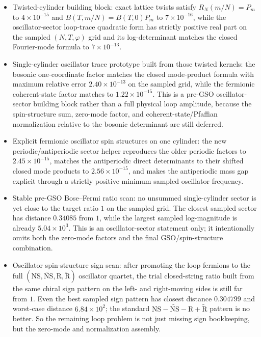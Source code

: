 \documentclass[11pt]{article}
\begin{document}
\begin{itemize}
\item Twisted-cylinder building block: exact lattice twists satisfy $R_N(m/N)=P_m$ to $4\times 10^{-15}$ and $B(T,m/N)=B(T,0)P_m$ to $7\times 10^{-16}$, while the oscillator-sector loop-trace quadratic form has strictly positive real part on the sampled $(N,T,\varphi)$ grid and its log-determinant matches the closed Fourier-mode formula to $7\times 10^{-13}$.
\item Single-cylinder oscillator trace prototype built from those twisted kernels: the bosonic one-coordinate factor matches the closed mode-product formula with maximum relative error $2.40\times 10^{-13}$ on the sampled grid, while the fermionic coherent-state factor matches to $1.22\times 10^{-15}$. This is a pre-GSO oscillator-sector building block rather than a full physical loop amplitude, because the spin-structure sum, zero-mode factor, and coherent-state/Pfaffian normalization relative to the bosonic determinant are still deferred.
\item Explicit fermionic oscillator spin structures on one cylinder: the new periodic/antiperiodic sector helper reproduces the older periodic factors to $2.45\times10^{-15}$, matches the antiperiodic direct determinants to their shifted closed mode products to $2.56\times10^{-15}$, and makes the antiperiodic mass gap explicit through a strictly positive minimum sampled oscillator frequency.
\item Stable pre-GSO Bose--Fermi ratio scan: no unsummed single-cylinder sector is yet close to the target ratio $1$ on the sampled grid. The closest sampled sector has distance $0.34085$ from $1$, while the largest sampled log-magnitude is already $5.04\times 10^3$. This is an oscillator-sector statement only; it intentionally omits both the zero-mode factors and the final GSO/spin-structure combination.
\item Oscillator spin-structure sign scan: after promoting the loop fermions to the full $(\mathrm{NS},\widetilde{\mathrm{NS}},\mathrm{R},\widetilde{\mathrm{R}})$ oscillator quartet, the trial closed-string ratio built from the same chiral sign pattern on the left- and right-moving sides is still far from $1$. Even the best sampled sign pattern has closest distance $0.304799$ and worst-case distance $6.84\times 10^2$; the standard $\mathrm{NS}-\widetilde{\mathrm{NS}}-\mathrm{R}+\widetilde{\mathrm{R}}$ pattern is no better. So the remaining loop problem is not just missing sign bookkeeping, but the zero-mode and normalization assembly.
\end{itemize}
\end{document}
